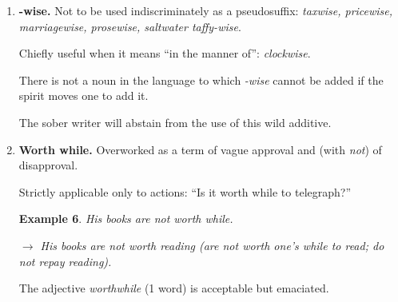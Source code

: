 \documentclass{book}
\numberwithin{equation}{section}
\newtheorem{example}{Example}[chapter]
\begin{document}
\begin{enumerate}
\begin{example}
        $\to$ The office and salesrooms are on the ground floor; the rest of the building is used for manufacturing.
    \end{example}
    Its use as a virtual equivalent \textit{of although} is allowable in sentences where this leads to no ambiguity or absurdity.
    \begin{example}
        While I admire his energy, I wish it were employed in a better cause.
    \end{example}
    This is entirely correct, as shown by the paraphrase
    \begin{example}
        I admire his energy; at the same time, I wish it were employed in a better cause.
    \end{example}
    Compare:
    \begin{example}
        While the temperature reaches 90 or 95 degrees in the daytime, the nights are often chilly.
    \end{example}
    The paraphrase shows why the use of \textit{while} is incorrect:
    \begin{example}
        The temperature reaches 90 or 95 degrees in the daytime; at the same time the nights are often chilly.
    \end{example}
    In general, the writer will do well to use \textit{while} only with strict literalness, in the sense of ``during the time that.''
    \item \textbf{-wise.} Not to be used indiscriminately as a pseudosuffix: \textit{taxwise, pricewise, marriagewise, prosewise, saltwater taffy-wise}.
    
    Chiefly useful when it means ``in the manner of'': \textit{clockwise}.
    
    There is not a noun in the language to which \textit{-wise} cannot be added if the spirit moves one to add it.
    
    The sober writer will abstain from the use of this wild additive.
    \item \textbf{Worth while.} Overworked as a term of vague approval and (with \textit{not}) of disapproval.
    
    Strictly applicable only to actions: ``Is it worth while to telegraph?''
    \begin{example}
        His books are not worth while.
        
        $\to$ His books are not worth reading (are not worth one's while to read; do not repay reading).
    \end{example}
    The adjective \textit{worthwhile} (1 word) is acceptable but emaciated.
    

\end{enumerate}
\end{document}
